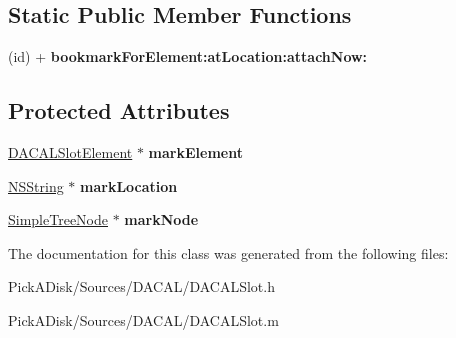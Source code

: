 \subsection*{Static Public Member Functions}
\begin{DoxyCompactItemize}
\item 
\hypertarget{interface_d_a_c_a_l_slot_element_bookmark_a4067319c610f3bf6516ed37869ec1250}{
(id) + {\bfseries bookmarkForElement:atLocation:attachNow:}}
\label{interface_d_a_c_a_l_slot_element_bookmark_a4067319c610f3bf6516ed37869ec1250}

\end{DoxyCompactItemize}
\subsection*{Protected Attributes}
\begin{DoxyCompactItemize}
\item 
\hypertarget{interface_d_a_c_a_l_slot_element_bookmark_ac27a497d011b8744f6fe9aa5dc6618d5}{
\hyperlink{interface_d_a_c_a_l_slot_element}{DACALSlotElement} $\ast$ {\bfseries markElement}}
\label{interface_d_a_c_a_l_slot_element_bookmark_ac27a497d011b8744f6fe9aa5dc6618d5}

\item 
\hypertarget{interface_d_a_c_a_l_slot_element_bookmark_a07190d41aa1d7f2d1bb1f56cfa773f3d}{
\hyperlink{class_n_s_string}{NSString} $\ast$ {\bfseries markLocation}}
\label{interface_d_a_c_a_l_slot_element_bookmark_a07190d41aa1d7f2d1bb1f56cfa773f3d}

\item 
\hypertarget{interface_d_a_c_a_l_slot_element_bookmark_a878180f9d3205e1ded1933d3c6b09cc5}{
\hyperlink{class_simple_tree_node}{SimpleTreeNode} $\ast$ {\bfseries markNode}}
\label{interface_d_a_c_a_l_slot_element_bookmark_a878180f9d3205e1ded1933d3c6b09cc5}

\end{DoxyCompactItemize}


The documentation for this class was generated from the following files:\begin{DoxyCompactItemize}
\item 
PickADisk/Sources/DACAL/DACALSlot.h\item 
PickADisk/Sources/DACAL/DACALSlot.m\end{DoxyCompactItemize}

